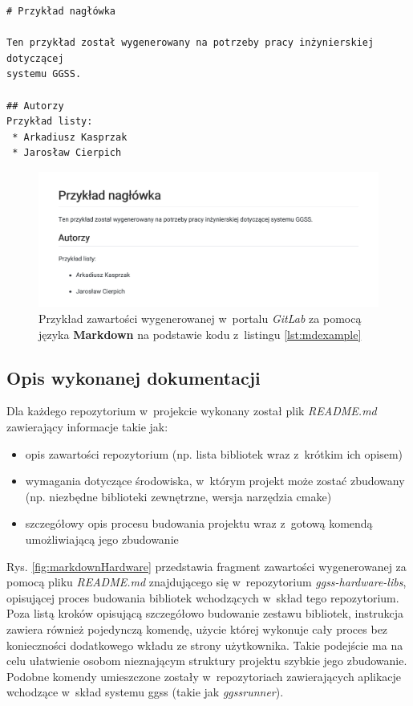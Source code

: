 \begin{lstlisting}[caption={Przykład prostego pliku napisanego w~języku \textbf{Markdown}}, label={lst:mdexample}]
# Przykład nagłówka

Ten przykład został wygenerowany na potrzeby pracy inżynierskiej dotyczącej 
systemu GGSS.

## Autorzy
Przykład listy:
 * Arkadiusz Kasprzak
 * Jarosław Cierpich
\end{lstlisting}

\begin{figure}
\centering
\includegraphics[width=\textwidth]{res/MarkdownExample}
\caption{Przykład zawartości wygenerowanej w~portalu \textit{GitLab} za pomocą języka \textbf{Markdown} na podstawie kodu z~listingu \ref{lst:mdexample}}
\label{fig:markdownExample}
\end{figure}

\newpage

\subsection{Opis wykonanej dokumentacji}
Dla każdego repozytorium w~projekcie wykonany został plik \textit{README.md} zawierający informacje takie jak:
\begin{itemize}
\item opis zawartości repozytorium (np. lista bibliotek wraz z~krótkim ich opisem)
\item wymagania dotyczące środowiska, w~którym projekt może zostać zbudowany (np. niezbędne biblioteki zewnętrzne, wersja narzędzia \gls*{cmake})
\item szczegółowy opis procesu budowania projektu wraz z~gotową komendą umożliwiającą jego zbudowanie 
\end{itemize}

Rys. \ref{fig:markdownHardware} przedstawia fragment zawartości wygenerowanej za pomocą pliku \textit{README.md} znajdującego się w~repozytorium \textit{ggss-hardware-libs}, opisującej proces budowania bibliotek wchodzących w~skład tego repozytorium. Poza listą kroków opisującą szczegółowo budowanie zestawu bibliotek, instrukcja zawiera również pojedynczą komendę, użycie której wykonuje cały proces bez konieczności dodatkowego wkładu ze strony użytkownika. Takie podejście ma na celu ułatwienie osobom nieznającym struktury projektu szybkie jego zbudowanie. Podobne komendy umieszczone zostały w~repozytoriach zawierających aplikacje wchodzące w~skład systemu \gls*{ggss} (takie jak \textit{ggssrunner}).

